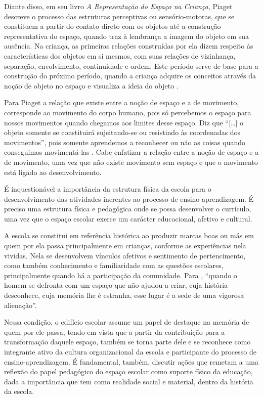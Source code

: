 \begin{refsection}
    Diante disso, em seu livro \textit{A Representação do Espaço na Criança}, Piaget descreve o processo das estruturas perceptivas ou sensório-motoras, que se constituem a partir do contato direto com os objetos até a construção representativa do espaço, quando traz à lembrança a imagem do objeto em sua ausência. Na criança, as primeiras relações construídas por ela dizem respeito às características dos objetos em si mesmos, com suas relações de vizinhança, separação, envolvimento, continuidade e ordem. Este período serve de base para a construção do próximo período, quando a criança adquire os conceitos através da noção de objeto no espaço e visualiza a ideia do objeto \cite{MONTOITOAndLEIVAS2012Representação}. 

    Para Piaget \cite[apud][]{CARPINTEROAndALMEIDA2009Teorias} a relação que existe entre a noção de espaço e a de movimento, corresponde ao movimento do corpo humano, pois só percebemos o espaço para nossos movimentos quando chegamos aos limites desse espaço. Diz que “[\dots] o objeto somente se constituirá sujeitando-se ou resistindo às coordenadas dos movimentos”, pois somente aprendemos a reconhecer ou não as coisas quando conseguimos movimentá-las \cite{CARPINTEROAndALMEIDA2009Teorias}. Cabe enfatizar a relação entre a noção de espaço e a de movimento, uma vez que não existe movimento sem espaço e que o movimento está ligado ao desenvolvimento. 

    É inquestionável a importância da estrutura física da escola para o desenvolvimento das atividades inerentes ao processo de ensino-aprendizagem. É preciso uma estrutura física e pedagógica onde se possa desenvolver o currículo, uma vez que o espaço escolar exerce um carácter educacional, afetivo e cultural. 

    A escola se constitui em referência histórica ao produzir marcas boas ou más em quem por ela passa principalmente em crianças, conforme as experiências nela vividas. Nela se desenvolvem vínculos afetivos e sentimento de pertencimento, como também conhecimento e familiaridade com as questões escolares, principalmente quando há a participação da comunidade. Para \textcite[p.~81]{SANTOS2014Espaço}, “quando o homem se defronta com um espaço que não ajudou a criar, cuja história desconhece, cuja memória lhe é estranha, esse lugar é a sede de uma vigorosa alienação”. 

    Nessa condição, o edifício escolar assume um papel de destaque na memória de quem por ele passa, tendo em vista que a partir da contribuição para a transformação daquele espaço, também se torna parte dele e se reconhece como integrante ativo da cultura organizacional da escola e participante do processo de ensino-aprendizagem. É fundamental, também, discutir ações que remetam a uma reflexão do papel pedagógico do espaço escolar como suporte físico da educação, dada a importância que tem como realidade social e material, dentro da história da escola.  


\end{refsection}
